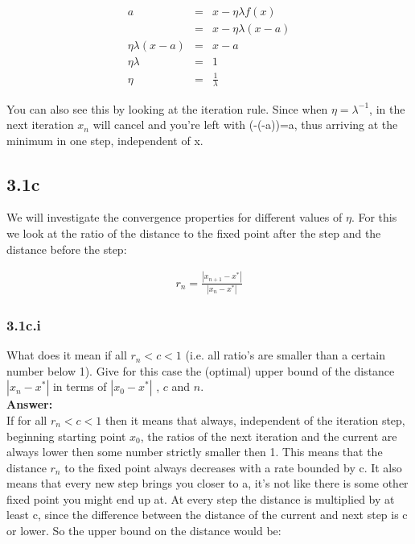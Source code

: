 \documentclass[a4paper]{article}
\begin{document}
\begin{eqnarray}
a &=& x - \eta \lambda f(x)\\
&=& x - \eta \lambda (x-a)\\
\eta \lambda (x-a) &=& x - a\\
\eta \lambda &=& 1\\
\eta &=& \frac{1}{\lambda}
\end{eqnarray}

You can also see this by looking at the iteration rule. Since when $\eta = \lambda^{-1}$, in the next iteration $x_n$ will cancel and you're left with (-(-a))=a, thus arriving at the minimum in one step, independent of x. 

\subsection*{3.1c}

We will investigate the convergence properties for different values of $\eta$. For this we look at the ratio of the distance to the fixed point after the step and the distance before the step:
 
\begin{eqnarray}
r_n = \frac{|x_{n+1} - x^*|}{|x_n - x^*|}
\end{eqnarray}

\subsubsection*{3.1c.i}

What does it mean if all $r_n < c < 1$ (i.e. all ratio’s are smaller than a certain number below 1). Give for this case the (optimal) upper bound of the distance $|x_n - x^*|$ in terms of $|x_0 - x^*|$ , $c$ and $n$.\\

\textbf{Answer:}\\

If for all $r_n < c < 1$ then it means that always, independent of the iteration step, beginning starting point $x_0$, the ratios of the next iteration and the current are always lower then some number strictly smaller then 1. This means that the distance $r_n$ to the fixed point always decreases with a rate bounded by c. It also means that every new step brings you closer to a, it's not like there is some other fixed point you might end up at.
\newpage 
At every step the distance is multiplied by at least c, since the difference between the distance of the current and next step is c or lower. So the upper bound on the distance would be:
\end{document}
